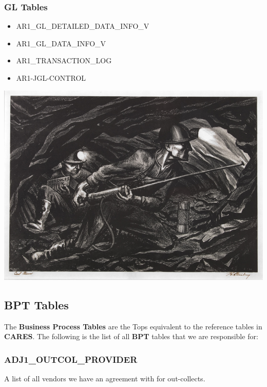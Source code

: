 \documentclass[12pt,twoside]{article}
\begin{document}
\normalsize

\subsubsection{GL Tables}
\label{sec:orgheadline98}
\begin{itemize}
\item AR1\_GL\_DETAILED\_DATA\_INFO\_V
\item AR1\_GL\_DATA\_INFO\_V
\item AR1\_TRANSACTION\_LOG
\item AR1-JGL-CONTROL
\end{itemize}
\includegraphics[width=16cm]{Pictures/coalminer.jpg}

\newpage
\subsection{BPT Tables}
\label{sec:orgheadline114}
The \textbf{Business Process Tables} are the Tops equivalent to the
reference tables in \textbf{CARES}. The following is the list of all
\textbf{BPT} tables that we are responsible for:

\subsubsection{ADJ1\_OUTCOL\_PROVIDER}
\label{sec:orgheadline100}
A list of all vendors we have an agreement with for out-collects.
\footnotesize
\end{document}
